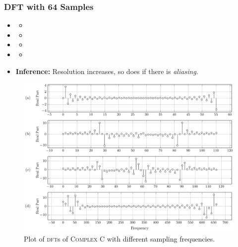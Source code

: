 \documentclass[../../course]{subfiles}
\begin{document}
\subsubsection{DFT with 64 Samples}

\begin{itemize} [label=]

    \item \sampFreqMuchLess
        \begin{itemize} [label=]
            \item
        \end{itemize}

    \item \sampFreqNorm
        \begin{itemize} [label=]
            \item
        \end{itemize}

    \item \sampFreqSligGreat
        \begin{itemize} [label=]
            \item
        \end{itemize}

    \item \sampFreqMuchGreat
        \begin{itemize} [label=]
            \item
        \end{itemize}

    \item \textbf{Inference:} Resolution increases, so does if there is \emph{aliasing}.

\end{itemize}

\vfill

\begin{figure} [H]
    \centering
     {
        \includegraphics[height = 0.8\textheight] {tikzpics/plotDftComplexC64.pdf}
    }
     {Plot of \textsc{dft}s of \textsc{Complex C} with different sampling frequencies.}
    \label{plt:dftCplxC64}
\end{figure}
\end{document}
